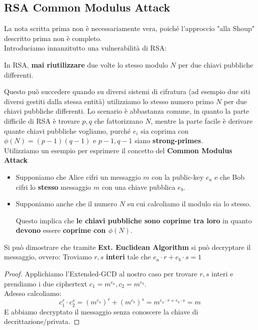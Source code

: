 \subsection{RSA Common Modulus Attack}
La nota scritta prima non è necessariamente vera, poiché l'approccio "alla Shoup" descritto prima non è completo.\\
Introduciamo innanzitutto una vulnerabilità di RSA: 
\begin{proposition}
In RSA, \textbf{mai riutilizzare} due volte lo stesso modulo $N$ per due chiavi pubbliche differenti.
\end{proposition}
Questo può succedere quando su diversi sistemi di cifratura (ad esempio due siti diversi gestiti dalla stessa entità) utilizziamo lo stesso numero primo $N$ per due chiavi pubbliche differenti. Lo scenario è abbastanza comune, in quanto la parte difficile di RSA è trovare $p,q$ che fattorizzano $N$, mentre la parte facile è derivare quante chiavi pubbliche vogliamo, purché $e_i$ sia coprima con $\phi(N)=(p-1)(q-1)$ e $p-1, q-1$ siano \textbf{strong-primes}.\\
Utilizziamo un esempio per esprimere il concetto del \textbf{Common Modulus Attack}
\begin{theorem}\label{thm:rsacomm}
\noindent\begin{itemize}
    \item Supponiamo che Alice cifri un messaggio $m$ con la public-key $e_a$ e che Bob cifri lo \textbf{stesso} messaggio $m$ con una chiave pubblica $e_b$.
    \item Supponiamo anche che il numero $N$ su cui calcoliamo il modulo sia lo stesso.\\
    \begin{remark}
    Questo implica che \textbf{le chiavi pubbliche sono coprime tra loro} in quanto \textbf{devono} essere \textbf{coprime con $\phi(N)$}.  
    \end{remark}
\end{itemize}
Si può dimostrare che tramite \textbf{Ext. Euclidean Algorithm} si può decryptare il messaggio, ovvero: Troviamo $r,s$ \textbf{interi} tale che $e_a\cdot r+e_b\cdot s=1$
\end{theorem}
\begin{proof}
Applichiamo l'Extended-GCD al nostro caso per trovare $r,s$ interi e prendiamo i due ciphertext $c_1=m^{e_a}, c_2=m^{e_b}$.\\
Adesso calcoliamo:
\begin{equation}\label{eq:rsamod}
    c_1^r\cdot c_2^s=(m^{e_a})^r+(m^{e_b})^s=m^{e_a\cdot r+e_b\cdot s}=m
\end{equation}
E abbiamo decryptato il messaggio senza conoscere la chiave di decrittazione/privata.
\end{proof}\pagebreak
